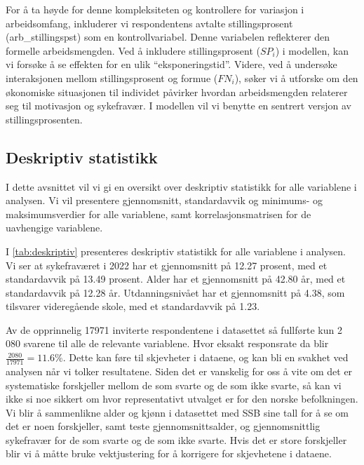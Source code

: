 \documentclass[
  12pt,
  a4paper,
  DIV=11,
  numbers=noendperiod]{scrartcl}
\begin{document}
For å ta høyde for denne kompleksiteten og kontrollere for variasjon i
arbeidsomfang, inkluderer vi respondentens avtalte stillingsprosent
(arb\_stillingspst) som en kontrollvariabel. Denne variabelen
reflekterer den formelle arbeidsmengden. Ved å inkludere
stillingsprosent (\(SP_i\)) i modellen, kan vi forsøke å se effekten for
en ulik ``eksponeringstid''. Videre, ved å undersøke interaksjonen
mellom stillingsprosent og formue (\(FN_i\)), søker vi å utforske om den
økonomiske situasjonen til individet påvirker hvordan arbeidsmengden
relaterer seg til motivasjon og sykefravær. I modellen vil vi benytte en
sentrert versjon av stillingsprosenten.

\subsection{Deskriptiv statistikk}\label{deskriptiv-statistikk}

I dette avsnittet vil vi gi en oversikt over deskriptiv statistikk for
alle variablene i analysen. Vi vil presentere gjennomsnitt,
standardavvik og minimums- og maksimumsverdier for alle variablene, samt
korrelasjonsmatrisen for de uavhengige variablene.

I \autoref{tab:deskriptiv} presenteres deskriptiv statistikk for alle
variablene i analysen. Vi ser at sykefraværet i 2022 har et gjennomsnitt
på 12.27 prosent, med et standardavvik på 13.49 prosent. Alder har et
gjennomsnitt på 42.80 år, med et standardavvik på 12.28 år.
Utdanningsnivået har et gjennomsnitt på 4.38, som tilsvarer videregående
skole, med et standardavvik på 1.23.

Av de opprinnelig 17971 inviterte respondentene i datasettet så
fullførte kun 2 080 svarene til alle de relevante variablene. Hvor
eksakt responsrate da blir \(\frac{2080}{17971} = 11.6\%\). Dette kan
føre til skjevheter i dataene, og kan bli en svakhet ved analysen når vi
tolker resultatene. Siden det er vanskelig for oss å vite om det er
systematiske forskjeller mellom de som svarte og de som ikke svarte, så
kan vi ikke si noe sikkert om hvor representativt utvalget er for den
norske befolkningen. Vi blir å sammenlikne alder og kjønn i datasettet
med SSB sine tall for å se om det er noen forskjeller, samt teste
gjennomsnittsalder, og gjennomsnittlig sykefravær for de som svarte og
de som ikke svarte. Hvis det er store forskjeller blir vi å måtte bruke
vektjustering for å korrigere for skjevhetene i dataene.
\end{document}
